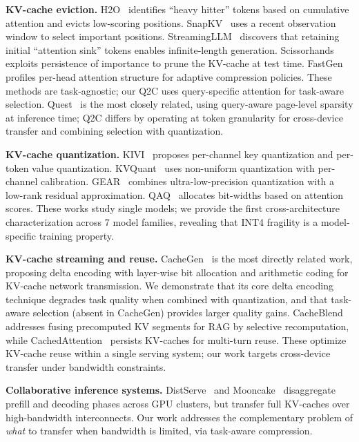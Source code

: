 \documentclass[conference]{IEEEtran}
\newcommand{\QtoC}{\textsc{Q2C}\xspace}
\begin{document}
\textbf{KV-cache eviction.}
H2O~\cite{h2o} identifies ``heavy hitter'' tokens based on cumulative attention and evicts low-scoring positions.
SnapKV~\cite{snapkv} uses a recent observation window to select important positions.
StreamingLLM~\cite{streamingllm} discovers that retaining initial ``attention sink'' tokens enables infinite-length generation.
Scissorhands~\cite{scissorhands} exploits persistence of importance to prune the KV-cache at test time.
FastGen~\cite{fastgen} profiles per-head attention structure for adaptive compression policies.
These methods are task-agnostic; our \QtoC uses query-specific attention for task-aware selection.
Quest~\cite{quest} is the most closely related, using query-aware page-level sparsity at inference time; \QtoC differs by operating at token granularity for cross-device transfer and combining selection with quantization.

\textbf{KV-cache quantization.}
KIVI~\cite{kivi} proposes per-channel key quantization and per-token value quantization.
KVQuant~\cite{kvquant} uses non-uniform quantization with per-channel calibration.
GEAR~\cite{gear} combines ultra-low-precision quantization with a low-rank residual approximation.
QAQ~\cite{qaq} allocates bit-widths based on attention scores.
These works study single models; we provide the first cross-architecture characterization across 7 model families, revealing that INT4 fragility is a model-specific training property.

\textbf{KV-cache streaming and reuse.}
CacheGen~\cite{cachegen} is the most directly related work, proposing delta encoding with layer-wise bit allocation and arithmetic coding for KV-cache network transmission.
We demonstrate that its core delta encoding technique degrades task quality when combined with quantization, and that task-aware selection (absent in CacheGen) provides larger quality gains.
CacheBlend~\cite{cacheblend} addresses fusing precomputed KV segments for RAG by selective recomputation, while CachedAttention~\cite{cachedattention} persists KV-caches for multi-turn reuse.
These optimize KV-cache reuse within a single serving system; our work targets cross-device transfer under bandwidth constraints.

\textbf{Collaborative inference systems.}
DistServe~\cite{distserve} and Mooncake~\cite{mooncake} disaggregate prefill and decoding phases across GPU clusters, but transfer full KV-caches over high-bandwidth interconnects.
Our work addresses the complementary problem of \emph{what} to transfer when bandwidth is limited, via task-aware compression.
\end{document}
